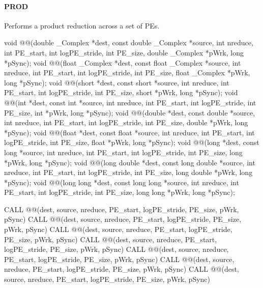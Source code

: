 \begin{apidefinition}
\paragraph{PROD}
Performs a product reduction across a set of \acp{PE}.\newline
\begin{Csynopsis}
void @@(double _Complex *dest, const double _Complex *source, int nreduce, int PE_start, int logPE_stride, int PE_size, double _Complex *pWrk, long *pSync);
void @@(float _Complex *dest, const float _Complex *source, int nreduce, int PE_start, int logPE_stride, int PE_size, float _Complex *pWrk, long *pSync);
void @@(short *dest, const short *source, int nreduce, int PE_start, int logPE_stride, int PE_size, short *pWrk, long *pSync);
void @@(int *dest, const int *source, int nreduce, int PE_start, int logPE_stride, int PE_size, int *pWrk, long *pSync);
void @@(double *dest, const double *source, int nreduce, int PE_start, int logPE_stride, int PE_size, double *pWrk, long *pSync);
void @@(float *dest, const float *source, int nreduce, int PE_start, int logPE_stride, int PE_size, float *pWrk, long *pSync);
void @@(long *dest, const long *source, int nreduce, int PE_start, int logPE_stride, int PE_size, long *pWrk, long *pSync);
void @@(long double *dest, const long double *source, int nreduce, int PE_start, int logPE_stride, int PE_size, long double *pWrk, long *pSync);
void @@(long long *dest, const long long *source, int nreduce, int PE_start, int logPE_stride, int PE_size, long long *pWrk, long *pSync);
\end{Csynopsis}

\begin{Fsynopsis}
CALL @@(dest, source, nreduce, PE_start, logPE_stride, PE_size, pWrk, pSync)
CALL @@(dest, source, nreduce, PE_start, logPE_stride, PE_size, pWrk, pSync)
CALL @@(dest, source, nreduce, PE_start, logPE_stride, PE_size, pWrk, pSync)
CALL @@(dest, source, nreduce, PE_start, logPE_stride, PE_size, pWrk, pSync)
CALL @@(dest, source, nreduce, PE_start, logPE_stride, PE_size, pWrk, pSync)
CALL @@(dest, source, nreduce, PE_start, logPE_stride, PE_size, pWrk, pSync)
CALL @@(dest, source, nreduce, PE_start, logPE_stride, PE_size, pWrk, pSync)
\end{Fsynopsis}


\end{apidefinition}
